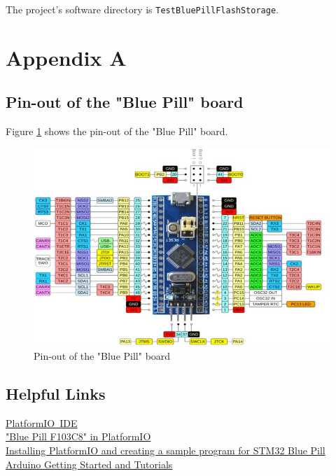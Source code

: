 \documentclass[11pt, oneside]{scrartcl}   	%
\begin{document}
The project's software directory is \verb!TestBluePillFlashStorage!.

\newpage
\appendix
\section{Appendix A}
\subsection{Pin-out of the "Blue Pill" board}
Figure \ref{fig:BluePillPinout} shows the pin-out of the "Blue Pill" board.
\begin{figure}[htbp]
	\centering
	\includegraphics[width=1.0\linewidth]{Figures/STM32-Blue-Pill-Development-Board-Pinout.jpg}
	\caption{Pin-out of the "Blue Pill" board}
	\label{fig:BluePillPinout}
\end{figure}

\subsection{Helpful Links}
\href{https://platformio.org/platformio-ide}{PlatformIO IDE}\\
\href{https://docs.platformio.org/en/latest//boards/ststm32/bluepill_f103c8.html}{"Blue Pill F103C8" in PlatformIO}\\
\href{https://www.youtube.com/watch?v=cmHQxd_qGl8}{Installing PlatformIO and creating a sample program for STM32 Blue Pill}\\
\href{https://www.arduino.cc/en/Tutorial/HomePage}{Arduino Getting Started and Tutorials}
\end{document}
